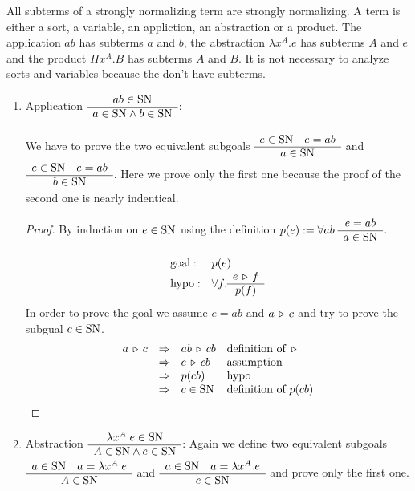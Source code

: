\begin{lemma}
  All subterms of a strongly normalizing term are strongly
  normalizing\label{stronglynormalizingsubterms}. A term is either a sort, a
  variable, an appliction, an abstraction or a product. The application $ab$
  has subterms $a$ and $b$, the abstraction $\lambda x^A.e$ has subterms $A$
  and $e$ and the product $\Pi x^A.B$ has subterms $A$ and $B$. It is not
  necessary to analyze sorts and variables because the don't have subterms.

  \begin{enumerate}


  \item Application
    $\begin{array}{c} ab \in \text{SN} \\ \hline a \in \text{SN} \land b \in \text{SN}\end{array}$:

    We have to prove the two equivalent subgoals
    $\begin{array}{c} e \in \text{SN} \quad e = ab \\ \hline a \in \text{SN}\end{array}$ and
    $\begin{array}{c} e \in \text{SN} \quad e = ab \\ \hline b \in \text{SN}\end{array}$. Here we prove only the first
    one because the proof of the second one is nearly indentical.

    \begin{proof} By induction on $e \in \text{SN}$ using the definition
      $p(e):= \forall a b. \begin{array}{c} e = a b \\ \hline a \in \text{SN}\end{array}$.

      $$
      \begin{array}{ll}
        \text{goal}: & p(e)
        \\
        \text{hypo}:
        & \forall f. \begin{array}{c} e \,\triangleright\, f \\ \hline p(f)\end{array}
      \end{array}
      $$
      In order to prove the goal we assume $e = a b$ and $a \,\triangleright\, c$ and try
      to prove the subgual $c \in \text{SN}$.
      $$
      \begin{array}{llll}
        a \,\triangleright\, c
        & \Rightarrow & ab \,\triangleright\, cb &\text{definition of }\,\triangleright\,
        \\
        & \Rightarrow & e \,\triangleright\, cb   &\text{assumption}
        \\
        & \Rightarrow & p(cb)          & \text{hypo}
        \\
        & \Rightarrow & c \in \text{SN}      & \text{definition of }p(cb)
      \end{array}
      $$
    \end{proof}


  \item Abstraction
    $\begin{array}{c} \lambda x^A.e \in \text{SN} \\ \hline A \in \text{SN} \land e \in \text{SN}\end{array}$:
    Again we define two equivalent subgoals
    $\begin{array}{c} a \in \text{SN} \quad a = \lambda x^A.e \\ \hline A \in \text{SN}\end{array}$ and
    $\begin{array}{c} a \in \text{SN} \quad a = \lambda x^A.e \\ \hline e \in \text{SN}\end{array}$ and prove only the
    first one.


\end{enumerate}
\end{lemma}

